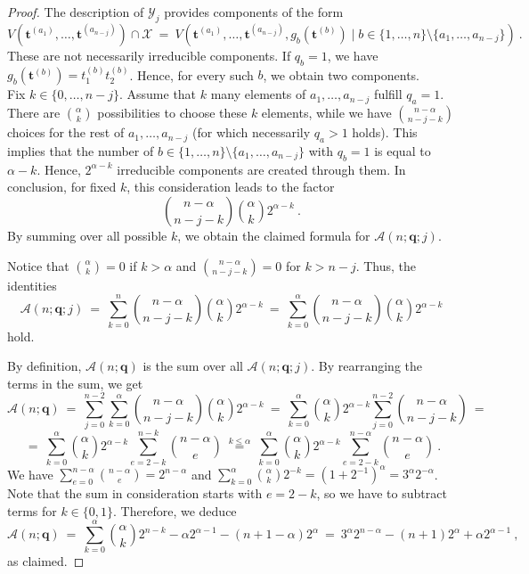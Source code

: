 \documentclass[letter,11pt]{amsart}
\newcommand{\q}{\boldsymbol{q}}
\renewcommand{\t}{\boldsymbol{t}}
\theoremstyle{theorem}
\theoremstyle{definition}
\numberwithin{equation}{section}
\begin{document}
\begin{proof}
	The description of $ \mathcal{Y}_j $ provides components of the form
	\[ 
		V(\t^{(a_1)}, \ldots, \t^{(a_{n-j})}) \cap \mathcal{X} 
		\ = \ 
		V(\t^{(a_1)}, \ldots, \t^{(a_{n-j})}, 
		g_b (\t^{(b)}) \mid 
		b \in \{ 1, \ldots, n\} \setminus \{ a_1, \ldots, a_{n-j} \}
		)
		\ . 
	\]
	These are not necessarily irreducible components. 
	If $ q_b = 1 $, 
	we have $ g_b (\t^{(b)}) = t_{1}^{(b)} t_{2}^{(b)} $. 
	Hence, for every such $ b $, we obtain two components.
	\\
	Fix $ k \in \{ 0, \ldots, n-j \} $.
	Assume that $ k $ many elements of $ a_1, \ldots, a_{n-j} $ fulfill $ q_a = 1 $.
	There are $ \binom{\alpha}{k} $ possibilities to choose these $ k $ elements,
	while we have $ \binom{n-\alpha}{n-j-k} $ choices for  the rest of $ a_1, \ldots, a_{n-j} $ 
	(for which necessarily $ q_a > 1 $ holds).
	This implies that the number of $ b \in \{ 1 , \ldots, n \}  \setminus \{ a_1, \ldots, a_{n-j} \} $
	with $ q_b = 1 $ is equal to $ \alpha - k $.
	Hence, $ 2^{\alpha-k} $ irreducible components are created through them.   
	In conclusion, for fixed $ k $, this consideration leads to the factor
	\[
		\binom{n-\alpha}{n-j-k} \binom{\alpha}{k} 2^{\alpha - k}
		\ . 
	\]
	By summing over all possible $ k $, we obtain the claimed formula for $ \mathcal{A} (n;\q; j)  $. 
	
		
	Notice that $ \binom{\alpha}{k} = 0 $ if $ k > \alpha $ and $ \binom{n-\alpha}{n-j-k} = 0 $ for $ k > n- j $.
	Thus, the identities
	\[
	\mathcal{A} (n;\q; j) 
	\ = \ 
	\sum_{k=0}^{n} 
	\binom{n-\alpha}{n-j-k} \binom{\alpha}{k} 2^{\alpha - k}
	\ = \ 
	\sum_{k=0}^{\alpha} 
	\binom{n-\alpha}{n-j-k} \binom{\alpha}{k} 2^{\alpha - k}
	\]
	hold.
	
	By definition, $ \mathcal{A} (n;\q) $ is the sum over all $ \mathcal{A} (n;\q;j) $.
	By rearranging the terms in the sum, 
	we get
	\[
		\mathcal{A} (n;\q)
		\ = \ 
		\sum_{j=0}^{n-2}  
		\sum_{k=0}^{\alpha} 
		\binom{n-\alpha}{n-j-k} \binom{\alpha}{k} 2^{\alpha - k}
		\ = \ 
		\sum_{k=0}^{\alpha} 
		 \binom{\alpha}{k} 2^{\alpha - k}
		 \sum_{j=0}^{n-2}   \binom{n-\alpha}{n-j-k}
		 \ = \ 
	\]
	\[
		\ = \ 
		\sum_{k=0}^{\alpha} 
		\binom{\alpha}{k} 2^{\alpha - k}
		\sum_{e = 2-k}^{n-k}   \binom{n-\alpha}{e}
		\ \stackrel{k \leq \alpha}{=} \
		\sum_{k=0}^{\alpha} 
		\binom{\alpha}{k} 2^{\alpha - k}
		\sum_{e = 2-k}^{n-\alpha}   \binom{n-\alpha}{e} 
		\ . 
	\]
	We have 
	$ \displaystyle \sum_{e=0}^{n-\alpha}   \binom{n-\alpha}{e}  = 2^{n-\alpha} $
	and $ \displaystyle \sum_{k=0}^{\alpha} 
	\binom{\alpha}{k} 2^{- k} = (1 + 2^{-1})^\alpha = 3^\alpha 2^{-\alpha} $.
	Note that the sum in consideration starts with $ e = 2 - k $, so we have to subtract terms for $ k \in \{0,1\} $.
	Therefore, we deduce 
	\[
		\mathcal{A} (n;\q)
		\ = \ 
		\sum_{k=0}^{\alpha} 
		\binom{\alpha}{k} 2^{n - k} 
		- \alpha 2^{\alpha - 1} 
		- (n+1 - \alpha) 2^{\alpha}
		\ = \
		3^\alpha 2^{n-\alpha}  
		- ( n + 1) 2^{\alpha} 
		+ \alpha 2^{\alpha - 1}
		\ ,
	\]
	as claimed.
\end{proof}
\end{document}
